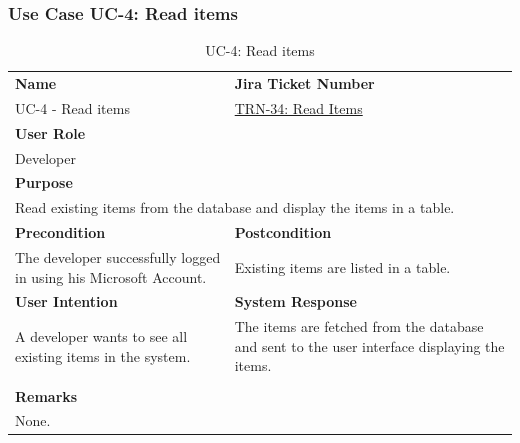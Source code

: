 \subsubsection{Use Case UC-4: Read items}\label{subsubsec:use-case-uc-4:-read-items}

\begin{table}[H]
    \centering
    \begin{tabular}{|p{}|p{}|}

        \hline
        \rowcolor{gray!50}\textbf{Name} & \rowcolor{gray!50}\textbf{Jira Ticket Number} \\
        UC-4 - Read items
        &
        \href{https://fh-burgenland.atlassian.net/browse/TRN-35}{TRN-34: Read Items} \\ \hline

        \multicolumn{2}{|l|}{\rowcolor{gray!50}\textbf{User Role}} \\
        \multicolumn{2}{|l|}{Developer} \\ \hline

        \multicolumn{2}{|l|}{\rowcolor{gray!50}\textbf{Purpose}} \\
        \multicolumn{2}{|l|}{Read existing items from the database and display the items in a table.} \\ \hline

        \rowcolor{gray!50}\textbf{Precondition} & \rowcolor{gray!50}\textbf{Postcondition} \\
        The developer successfully logged in using his Microsoft Account.
        &
        Existing items are listed in a table.  \\ \hline

        \rowcolor{gray!50}\textbf{User Intention} & \rowcolor{gray!50}\textbf{System Response} \\
        A developer wants to see all existing items in the system.
        &
        The items are fetched from the database and sent to the user interface displaying the items. \\ \hline

        & \\ \hline

        \multicolumn{2}{|l|}{\rowcolor{gray!50}\textbf{Remarks}} \\
        \multicolumn{2}{|p{1\textwidth}|}{None.} \\ \hline
    \end{tabular}
    \caption{UC-4: Read items}
    \label{tab:uc-read-items}
\end{table}

